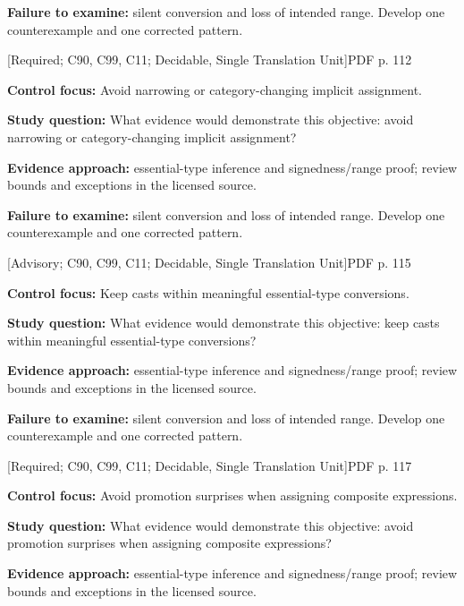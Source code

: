 \documentclass[10pt,letterpaper]{article}
\begin{document}
\textbf{Failure to examine:} silent conversion and loss of intended range. Develop one counterexample and one corrected pattern.\par
\smallskip
{}
 \textsf{\footnotesize [Required; C90, C99, C11; Decidable, Single Translation Unit]}\hfill{\footnotesize PDF p. 112}\par
\textbf{Control focus:} Avoid narrowing or category-changing implicit assignment.\par
\textbf{Study question:} What evidence would demonstrate this objective: avoid narrowing or category-changing implicit assignment?\par
\textbf{Evidence approach:} essential-type inference and signedness/range proof; review bounds and exceptions in the licensed source.\par
\textbf{Failure to examine:} silent conversion and loss of intended range. Develop one counterexample and one corrected pattern.\par
\smallskip
{}
 \textsf{\footnotesize [Advisory; C90, C99, C11; Decidable, Single Translation Unit]}\hfill{\footnotesize PDF p. 115}\par
\textbf{Control focus:} Keep casts within meaningful essential-type conversions.\par
\textbf{Study question:} What evidence would demonstrate this objective: keep casts within meaningful essential-type conversions?\par
\textbf{Evidence approach:} essential-type inference and signedness/range proof; review bounds and exceptions in the licensed source.\par
\textbf{Failure to examine:} silent conversion and loss of intended range. Develop one counterexample and one corrected pattern.\par
\smallskip
{}
 \textsf{\footnotesize [Required; C90, C99, C11; Decidable, Single Translation Unit]}\hfill{\footnotesize PDF p. 117}\par
\textbf{Control focus:} Avoid promotion surprises when assigning composite expressions.\par
\textbf{Study question:} What evidence would demonstrate this objective: avoid promotion surprises when assigning composite expressions?\par
\textbf{Evidence approach:} essential-type inference and signedness/range proof; review bounds and exceptions in the licensed source.\par
\end{document}
